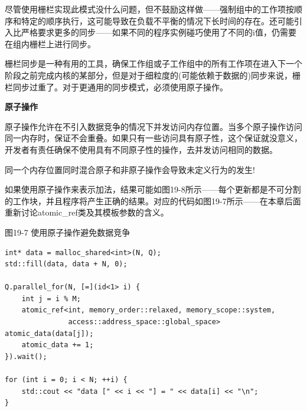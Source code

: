 尽管使用栅栏实现此模式没什么问题，但不鼓励这样做——强制组中的工作项按顺序和特定的顺序执行，这可能导致在负载不平衡的情况下长时间的存在。还可能引入比严格要求更多的同步——如果不同的程序实例碰巧使用了不同的i值，仍需要在组内栅栏上进行同步。\par

栅栏同步是一种有用的工具，确保工作组或子工作组中的所有工作项在进入下一个阶段之前完成内核的某部分，但是对于细粒度的(可能依赖于数据的)同步来说，栅栏同步过重了。对于更通用的同步模式，必须使用原子操作。\par

\hspace*{\fill} \par %
\textbf{原子操作}

原子操作允许在不引入数据竞争的情况下并发访问内存位置。当多个原子操作访问同一内存时，保证不会重叠。如果只有一些访问具有原子性，这个保证就没意义，开发者有责任确保不使用具有不同原子性的操作，去并发访问相同的数据。\par

\begin{tcolorbox}[colback=red!5!white,colframe=red!75!black]
同一个内存位置同时混合原子和非原子操作会导致未定义行为的发生!
\end{tcolorbox}

如果使用原子操作来表示加法，结果可能如图19-8所示——每个更新都是不可分割的工作块，并且程序将产生正确的结果。对应的代码如图19-7所示——在本章后面重新讨论atomic\_ref类及其模板参数的含义。\par

\hspace*{\fill} \par %
图19-7 使用原子操作避免数据竞争
\begin{lstlisting}[caption={}]
int* data = malloc_shared<int>(N, Q);
std::fill(data, data + N, 0);

Q.parallel_for(N, [=](id<1> i) {
	int j = i % M;
	atomic_ref<int, memory_order::relaxed, memory_scope::system,
			   access::address_space::global_space> atomic_data(data[j]);
	atomic_data += 1;
}).wait();

for (int i = 0; i < N; ++i) {
	std::cout << "data [" << i << "] = " << data[i] << "\n";
}
\end{lstlisting}

